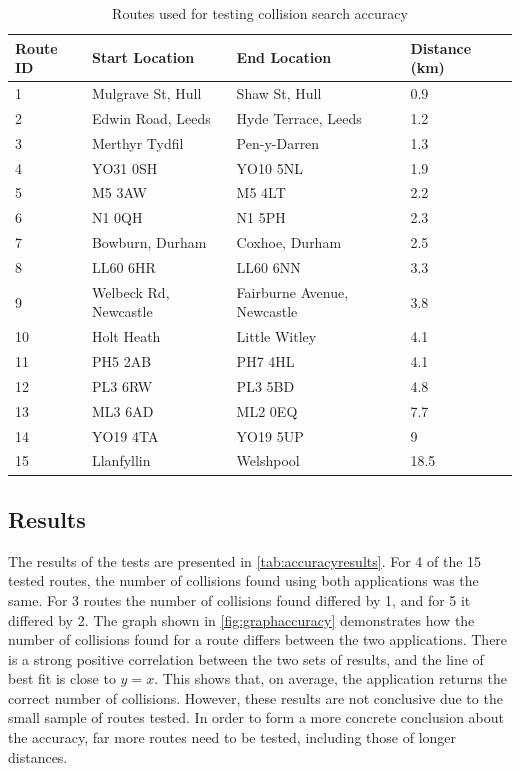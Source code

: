 \documentclass[authoryearcitations]{UoYCSproject}
\begin{document}
\begin{table}
	\center
	\caption{Routes used for testing collision search accuracy}
	\label{tab:accuracyroutes}
	\begin{tabular}{| l | l | l | l |}
	\hline
	\textbf{Route ID} & \textbf{Start Location} & \textbf{End Location} & \textbf{Distance (km)}  \\ \hline
	1 & Mulgrave St, Hull & Shaw St, Hull & 0.9  \\ \hline 	
	2 & Edwin Road, Leeds & Hyde Terrace, Leeds & 1.2  \\ \hline 
	3 & Merthyr Tydfil & Pen-y-Darren & 1.3  \\ \hline 
	4 & YO31 0SH & YO10 5NL & 1.9 \\ \hline
	5 & M5 3AW & M5 4LT & 2.2  \\ \hline 
	6 & N1 0QH & N1 5PH & 2.3 \\ \hline
	7 & Bowburn, Durham & Coxhoe, Durham & 2.5  \\ \hline 
	8 & LL60 6HR & LL60 6NN & 3.3  \\ \hline 
	9 & Welbeck Rd, Newcastle & Fairburne Avenue, Newcastle & 3.8  \\ \hline 
	10 & Holt Heath & Little Witley & 4.1 \\ \hline
	11 & PH5 2AB & PH7 4HL & 4.1 \\ \hline
	12 & PL3 6RW & PL3 5BD & 4.8  \\ \hline 
	13 & ML3 6AD & ML2 0EQ & 7.7  \\ \hline 
	14 & YO19 4TA & YO19 5UP & 9  \\ \hline 
	15 & Llanfyllin & Welshpool & 18.5  \\ \hline 
	\end{tabular}
\end{table}

\subsection{Results}

The results of the tests are presented in \autoref{tab:accuracyresults}. For 4 of the 15 tested routes, the number of collisions found using both applications was the same. For 3 routes the number of collisions found differed by 1, and for 5 it differed by 2. The graph shown in \autoref{fig:graphaccuracy} demonstrates how the number of collisions found for a route differs between the two applications. There is a strong positive correlation between the two sets of results, and the line of best fit is close to $y=x$. This shows that, on average, the application returns the correct number of collisions. However, these results are not conclusive due to the small sample of routes tested. In order to form a more concrete conclusion about the accuracy, far more routes need to be tested, including those of longer distances.
\end{document}
